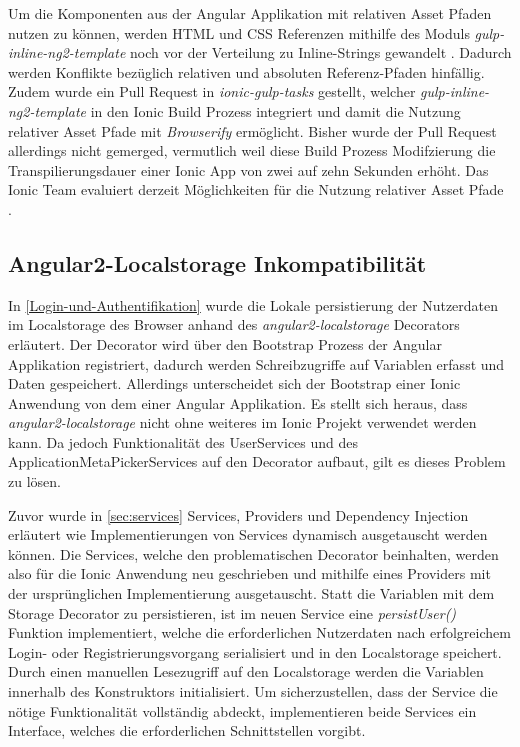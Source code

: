 Um die Komponenten aus der Angular Applikation mit relativen Asset Pfaden nutzen zu können,
werden \ac{HTML} und \ac{CSS} Referenzen mithilfe des Moduls \emph{gulp-inline-ng2-template} noch vor der Verteilung zu Inline-Strings gewandelt \cite{ludoh30:online}.
Dadurch werden Konflikte bezüglich relativen und absoluten Referenz-Pfaden hinfällig.
Zudem wurde ein Pull Request in \emph{ionic-gulp-tasks} gestellt, welcher \emph{gulp-inline-ng2-template}
in den Ionic Build Prozess integriert und damit die Nutzung relativer Asset Pfade mit \emph{Browserify} ermöglicht.
Bisher wurde der Pull Request allerdings nicht gemerged, vermutlich weil diese Build Prozess Modifzierung die
Transpilierungsdauer einer Ionic App von zwei auf zehn Sekunden erhöht.
Das Ionic Team evaluiert derzeit Möglichkeiten für die Nutzung relativer Asset Pfade \cite{relat31:online}.

\subsection{Angular2-Localstorage Inkompatibilität}
In \ref{Login-und-Authentifikation} wurde die Lokale persistierung der Nutzerdaten im Localstorage
des Browser anhand des \emph{angular2-localstorage} Decorators erläutert.
Der Decorator wird über den Bootstrap Prozess der Angular Applikation registriert,
dadurch werden Schreibzugriffe auf Variablen erfasst und Daten gespeichert.
Allerdings unterscheidet sich der Bootstrap einer Ionic Anwendung von dem einer Angular Applikation.
Es stellt sich heraus, dass \emph{angular2-localstorage} nicht ohne weiteres im Ionic Projekt verwendet werden kann.
Da jedoch Funktionalität des UserServices und des ApplicationMetaPickerServices auf den Decorator aufbaut,
gilt es dieses Problem zu lösen.

Zuvor wurde in \ref{sec:services} Services, Providers und Dependency Injection erläutert wie
Implementierungen von Services dynamisch ausgetauscht werden können.
Die Services, welche den problematischen Decorator beinhalten, werden also für die Ionic Anwendung neu geschrieben
und mithilfe eines Providers mit der ursprünglichen Implementierung ausgetauscht.
Statt die Variablen mit dem Storage Decorator zu persistieren, ist im neuen Service eine \emph{persistUser()} Funktion implementiert, welche die erforderlichen Nutzerdaten nach
erfolgreichem Login- oder Registrierungsvorgang serialisiert und in den Localstorage speichert.
Durch einen manuellen Lesezugriff auf den Localstorage werden die Variablen innerhalb des Konstruktors initialisiert.
Um sicherzustellen, dass der Service die nötige Funktionalität vollständig abdeckt, implementieren beide Services ein Interface,
welches die erforderlichen Schnittstellen vorgibt.



